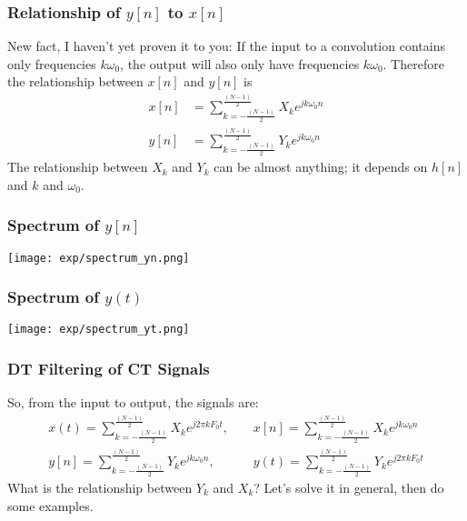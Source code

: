 
\begin{frame}
  \frametitle{Relationship of $y[n]$ to $x[n]$}

  New fact, I haven't yet proven it to you: If the input to a
  convolution contains only frequencies $k\omega_0$, the output will
  also only have frequencies $k\omega_0$.  Therefore the relationship
  between $x[n]$ and $y[n]$ is
  \begin{align*}
    x[n]&=\sum_{k=-\frac{(N-1)}{2}}^{\frac{(N-1)}{2}}X_ke^{jk\omega_0n}\\
    y[n]&=\sum_{k=-\frac{(N-1)}{2}}^{\frac{(N-1)}{2}}Y_ke^{jk\omega_0n}
  \end{align*}
  The relationship between $X_k$ and $Y_k$ can be almost anything; it
  depends on $h[n]$ and $k$ and $\omega_0$.
\end{frame}

\begin{frame}
  \frametitle{Spectrum of $y[n]$}

  \centerline{\texttt{[image: exp/spectrum\_yn.png]}}
\end{frame}

\begin{frame}
  \frametitle{Spectrum of $y(t)$}

  \centerline{\texttt{[image: exp/spectrum\_yt.png]}}
\end{frame}

\begin{frame}
  \frametitle{DT Filtering of CT Signals}

  \begin{center}
  \end{center}
  So, from the input to output, the signals are:
  \begin{align*}
    x(t)=\sum_{k=-\frac{(N-1)}{2}}^{\frac{(N-1)}{2}}X_ke^{j2\pi kF_0t},~~~~~
    &x[n]=\sum_{k=-\frac{(N-1)}{2}}^{\frac{(N-1)}{2}}X_ke^{jk\omega_0n}\\
    y[n]=\sum_{k=-\frac{(N-1)}{2}}^{\frac{(N-1)}{2}}Y_ke^{jk\omega_0n},~~~~~
    &y(t)=\sum_{k=-\frac{(N-1)}{2}}^{\frac{(N-1)}{2}}Y_ke^{j2\pi kF_0t}
  \end{align*}
  What is the relationship between $Y_k$ and $X_k$?  Let's solve it in
  general, then do some examples.
\end{frame}


